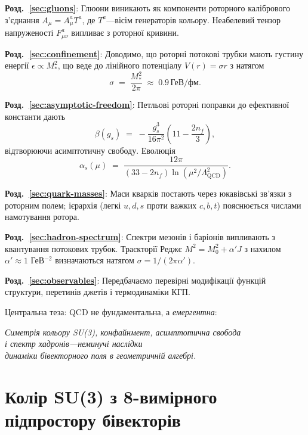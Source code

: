 \documentclass[11pt,a4paper]{article}
\theoremstyle{definition}
\theoremstyle{plain}
\theoremstyle{remark}
\begin{document}
\textbf{Розд.~\ref{sec:gluons}}: Глюони виникають як компоненти роторного калібрового з’єднання $A_\mu=A_\mu^aT^a$, де $T^a$—вісім генераторів кольору. Неабелевий тензор напруженості $F_{\mu\nu}^a$ випливає з роторної кривини.

\textbf{Розд.~\ref{sec:confinement}}: Доводимо, що роторні потокові трубки мають густину енергії $\epsilon\propto M_\ast^2$, що веде до лінійного потенціалу $V(r)=\sigma r$ з натягом
\begin{equation}
\sigma \;=\; \frac{M_\ast^2}{2\pi} \;\approx\; 0{.}9\,\text{ГеВ/фм}.
\end{equation}

\textbf{Розд.~\ref{sec:asymptotic-freedom}}: Петльові роторні поправки до ефективної константи дають
\begin{equation}
\beta(g_s) \;=\; -\frac{g_s^3}{16\pi^2}\left(11 - \frac{2n_f}{3}\right),
\end{equation}
відтворюючи асимптотичну свободу. Еволюція
\begin{equation}
\alpha_s(\mu) \;=\; \frac{12\pi}{(33 - 2n_f)\ln(\mu^2/\Lambda_{\mathrm{QCD}}^2)}.
\end{equation}

\textbf{Розд.~\ref{sec:quark-masses}}: Маси кварків постають через юкавівські зв’язки з роторним полем; ієрархія (легкі $u,d,s$ проти важких $c,b,t$) пояснюється числами намотування ротора.

\textbf{Розд.~\ref{sec:hadron-spectrum}}: Спектри мезонів і баріонів випливають з квантування потокових трубок. Траєкторії Реджє $M^2=M_0^2+\alpha' J$ з нахилом $\alpha'\approx 1$ ГеВ$^{-2}$ визначаються натягом $\sigma=1/(2\pi\alpha')$.

\textbf{Розд.~\ref{sec:observables}}: Передбачаємо перевірні модифікації функцій структури, перетинів джетів і термодинаміки КГП.

Центральна теза: QCD не фундаментальна, а \emph{емергентна}:

\begin{center}
\textit{Симетрія кольору SU(3), конфайнмент, асимптотична свобода \\
і спектр хадронів—неминучі наслідки \\
динаміки бівекторного поля в геометричній алгебрі.}
\end{center}

\vspace{1em}

\section{Колір SU(3) з 8-вимірного підпростору бівекторів}
\label{sec:color-su3}
\end{document}
